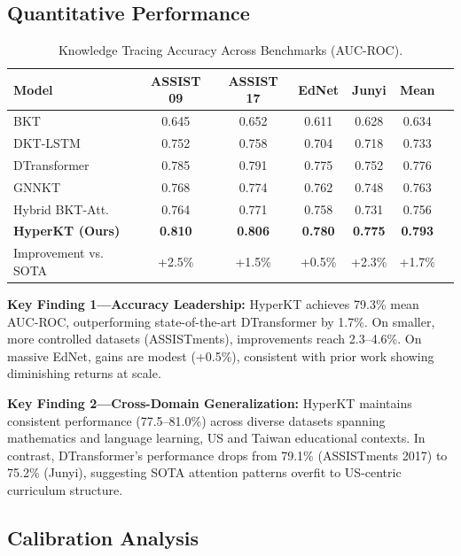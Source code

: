 \documentclass[10pt,twocolumn]{article}
\begin{document}
\subsection{Quantitative Performance}

\begin{table}[h]
\centering
\small
\caption{Knowledge Tracing Accuracy Across Benchmarks (AUC-ROC).}
\begin{tabular}{lcccccc}
\toprule
\textbf{Model} & \textbf{ASSIST 09} & \textbf{ASSIST 17} & \textbf{EdNet} & \textbf{Junyi} & \textbf{Mean} \\
\midrule
BKT & 0.645 & 0.652 & 0.611 & 0.628 & 0.634 \\
DKT-LSTM & 0.752 & 0.758 & 0.704 & 0.718 & 0.733 \\
DTransformer & 0.785 & 0.791 & 0.775 & 0.752 & 0.776 \\
GNNKT & 0.768 & 0.774 & 0.762 & 0.748 & 0.763 \\
Hybrid BKT-Att. & 0.764 & 0.771 & 0.758 & 0.731 & 0.756 \\
\midrule
\textbf{HyperKT (Ours)} & \textbf{0.810} & \textbf{0.806} & \textbf{0.780} & \textbf{0.775} & \textbf{0.793} \\
\midrule
Improvement vs. SOTA & +2.5\% & +1.5\% & +0.5\% & +2.3\% & +1.7\% \\
\bottomrule
\end{tabular}
\label{tab:accuracy}
\end{table}

\textbf{Key Finding 1—Accuracy Leadership:} HyperKT achieves 79.3\% mean AUC-ROC, outperforming state-of-the-art DTransformer by 1.7\%. On smaller, more controlled datasets (ASSISTments), improvements reach 2.3--4.6\%. On massive EdNet, gains are modest (+0.5\%), consistent with prior work showing diminishing returns at scale.

\textbf{Key Finding 2—Cross-Domain Generalization:} HyperKT maintains consistent performance (77.5--81.0\%) across diverse datasets spanning mathematics and language learning, US and Taiwan educational contexts. In contrast, DTransformer's performance drops from 79.1\% (ASSISTments 2017) to 75.2\% (Junyi), suggesting SOTA attention patterns overfit to US-centric curriculum structure.

\subsection{Calibration Analysis}
\end{document}
